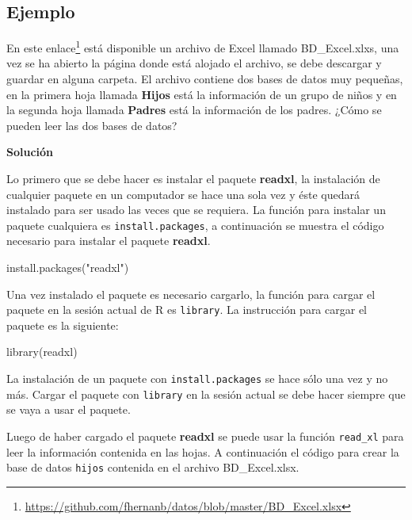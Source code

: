 \documentclass[
]{book}
\makeatletter
\newenvironment{Shaded}{\begin{snugshade}}{\end{snugshade}}
\newcommand{\FunctionTok}[1]{\textcolor[rgb]{0.00,0.00,0.00}{#1}}
\newcommand{\NormalTok}[1]{#1}
\newcommand{\StringTok}[1]{\textcolor[rgb]{0.31,0.60,0.02}{#1}}
\renewcommand{\href}[2]{#2\footnote{\url{#1}}}
\newenvironment{kframe}{%
\medskip{}
\setlength{\fboxsep}{.8em}
 \def\at@end@of@kframe{}%
 \ifinner\ifhmode%
  \def\at@end@of@kframe{\end{minipage}}%
  \begin{minipage}{\columnwidth}%
 \fi\fi%
 \def\FrameCommand##1{\hskip\@totalleftmargin \hskip-\fboxsep
 \colorbox{shadecolor}{##1}\hskip-\fboxsep
     \hskip-\linewidth \hskip-\@totalleftmargin \hskip\columnwidth}%
 \MakeFramed {\advance\hsize-\width
   \@totalleftmargin\z@ \linewidth\hsize
   \@setminipage}}%
 {\par\unskip\endMakeFramed%
 \at@end@of@kframe}
\renewenvironment{Shaded}{\begin{kframe}}{\end{kframe}}
\newenvironment{rmdblock}[1]
  {
  \begin{itemize}
  \renewcommand{\labelitemi}{
    \raisebox{-.7\height}[0pt][0pt]{
      {\setkeys{Gin}{width=3em,keepaspectratio}\texttt{[image: images/\#1]}}
    }
  }
  \setlength{\fboxsep}{1em}
  \begin{kframe}
  \item
  }
  {
  \end{kframe}
  \end{itemize}
  }
\newenvironment{rmdwarning}
  {\begin{rmdblock}{warning}}
  {\end{rmdblock}}
\makeatother
\begin{document}
\hypertarget{ejemplo-26}{%
\subsection*{Ejemplo}\label{ejemplo-26}}

En este \href{https://github.com/fhernanb/datos/blob/master/BD_Excel.xlsx}{enlace} está disponible un archivo de Excel llamado BD\_Excel.xlxs, una vez se ha abierto la página donde está alojado el archivo, se debe descargar y guardar en alguna carpeta. El archivo contiene dos bases de datos muy pequeñas, en la primera hoja llamada \textbf{Hijos} está la información de un grupo de niños y en la segunda hoja llamada \textbf{Padres} está la información de los padres. ¿Cómo se pueden leer las dos bases de datos?

\textbf{Solución}

Lo primero que se debe hacer es instalar el paquete \textbf{readxl}, la instalación de cualquier paquete en un computador se hace una sola vez y éste quedará instalado para ser usado las veces que se requiera. La función para instalar un paquete cualquiera es \texttt{install.packages}, a continuación se muestra el código necesario para instalar el paquete \textbf{readxl}.

\begin{Shaded}
\begin{Highlighting}[]
\FunctionTok{install.packages}\NormalTok{(}\StringTok{"readxl"}\NormalTok{)}
\end{Highlighting}
\end{Shaded}

Una vez instalado el paquete es necesario cargarlo, la función para cargar el paquete en la sesión actual de R es \texttt{library}. La instrucción para cargar el paquete es la siguiente:

\begin{Shaded}
\begin{Highlighting}[]
\FunctionTok{library}\NormalTok{(readxl)}
\end{Highlighting}
\end{Shaded}

\begin{rmdwarning}
La instalación de un paquete con \texttt{install.packages} se hace sólo una vez y no más. Cargar el paquete con \texttt{library} en la sesión actual se debe hacer siempre que se vaya a usar el paquete.
\end{rmdwarning}

Luego de haber cargado el paquete \textbf{readxl} se puede usar la función \texttt{read\_xl} para leer la información contenida en las hojas. A continuación el código para crear la base de datos \texttt{hijos} contenida en el archivo BD\_Excel.xlsx.
\end{document}
